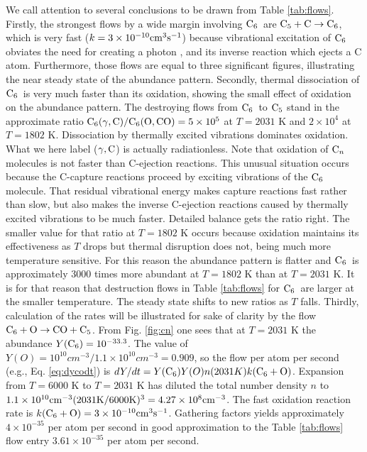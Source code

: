 \documentclass[manuscript]{aastex}
\newcommand{\cfive}{{\rm C}_5}
\newcommand{\csix}{{\rm C}_6}
\newcommand{\cenn}{{\rm C}_n}
\newcommand{\cfivectocsix}{$\cfive + {\rm C} \to \csix$}
\newcommand{\csixotococfive}{${\rm C}_6 + {\rm O} \to {\rm CO} + {\rm C_5}$}
\begin{document}
We call attention to several conclusions to be drawn from Table \ref{tab:flows}.
Firstly, the strongest flows by a wide margin involving $\csix$\ are
\cfivectocsix,
which is very fast ($k = 3 \times 10^{-10} {\rm cm}^3 {\rm s}^{-1}$)
because vibrational excitation of $\csix$
obviates the need for creating a photon \citep{1999Sci...283.1290C},
and its inverse reaction which ejects a C atom. Furthermore, those flows
are equal to three significant figures, illustrating the near steady
state of the abundance pattern. Secondly, thermal dissociation of $\csix$\ is
very much faster than its oxidation, showing the small effect of oxidation
on the abundance pattern. The destroying flows from $\csix$\ to $\cfive$
stand in the approximate ratio
${\rm C}_6(\gamma,{\rm C})/{\rm C_6}({\rm O},{\rm CO}) = 5 \times 10^5$
at $T = 2031$ K and $2 \times 10^4$ at $T = 1802$ K.
Dissociation by thermally excited vibrations dominates oxidation. What we here
label ($\gamma,{\rm C}$) is actually radiationless. Note that oxidation of
$\cenn$ molecules is not faster than C-ejection reactions. This unusual
situation occurs because the C-capture reactions proceed by exciting 
vibrations of the $\csix$ molecule. That residual vibrational energy makes
capture reactions fast rather than slow, but also makes the inverse C-ejection
reactions caused by thermally excited vibrations to be much faster. Detailed
balance gets the ratio right. The smaller value for that ratio at $T=1802$ K
occurs because oxidation maintains its effectiveness as $T$ drops but
thermal disruption does not, being much more temperature sensitive.
For this reason the abundance pattern is flatter and $\csix$\ is approximately
3000 times more abundant at $T=1802$ K than at $T=2031$ K.
It is for that reason that destruction flows in Table \ref{tab:flows}
for $\csix$\ are
larger at the smaller temperature.
The steady state shifts to new ratios as $T$ falls.
Thirdly, calculation of the rates will be illustrated for sake of clarity
by the flow
\csixotococfive.
From Fig. \ref{fig:cn}
one sees that at $T = 2031$ K the abundance $Y(\csix) = 10^{-33.3}$.
The value of $Y(O) = 10^{10} cm^{-3} / 1.1 \times 10^{10} cm^{-3} = 0.909$,
so the flow per atom per
second (e.g., Eq. \ref{eq:dycodt}) is
$dY/dt= Y(\csix)Y(O)n(2031K)k(\csix + {\rm O})$.
Expansion from $T=6000$ K to $T=2031$ K has diluted the total number
density $n$ to $1.1 \times 10^{10}{\rm cm}^{-3}
(2031 {\rm K}/6000 {\rm K})^3 = 4.27 \times 10^8{\rm cm}^{-3}$.
The fast oxidation reaction rate is
$k(\csix + {\rm O}) = 3 \times 10^{-10} {\rm cm}^3{\rm s}^{-1}$.
Gathering factors yields approximately $4 \times 10^{-35}$ per atom
per second
in good approximation to the Table \ref{tab:flows}
flow entry $3.61 \times 10^{-35}$ per atom per second.
\end{document}
